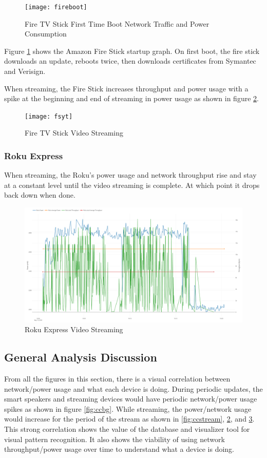 \begin{figure}[H]
  \centering
  \texttt{[image: fireboot]}
  \caption{Fire TV Stick First Time Boot Network Traffic and Power Consumption}
  \label{fig:fireboth}
\end{figure}

Figure \ref{fig:fireboth} shows the Amazon Fire Stick startup graph. On first boot, the fire stick downloads an update, reboots twice, then downloads certificates from Symantec and Verisign.

When streaming, the Fire Stick increases throughput and power usage with a spike at the beginning and end of streaming in power usage as shown in figure \ref{fig:fsyt}.

\begin{figure}[H]
  \centering
  \texttt{[image: fsyt]}
  \caption{Fire TV Stick Video Streaming}
  \label{fig:fsyt}
\end{figure}

\subsubsection{Roku Express}
When streaming, the Roku's power usage and network throughput rise and stay at a constant level until the video streaming is complete. At which point it drops back down when done.

\begin{figure}[H]
  \centering
  \includegraphics[width=1\textwidth]{figures/rokuStreaming.png}
  \caption{Roku Express Video Streaming}
  \label{fig:rokuStreaming}
\end{figure}

\subsection{General Analysis Discussion}
From all the figures in this section, there is a visual correlation between network/power usage and what each device is doing. During periodic updates, the smart speakers and streaming devices would have periodic network/power usage spikes as shown in figure \ref{fig:ccbg}. While streaming, the power/network usage would increase for the period of the stream as shown in \ref{fig:ccstream}, \ref{fig:fsyt}, and \ref{fig:rokuStreaming}. This strong correlation shows the value of the database and visualizer tool for visual pattern recognition. It also shows the viability of using network throughput/power usage over time to understand what a device is doing.

